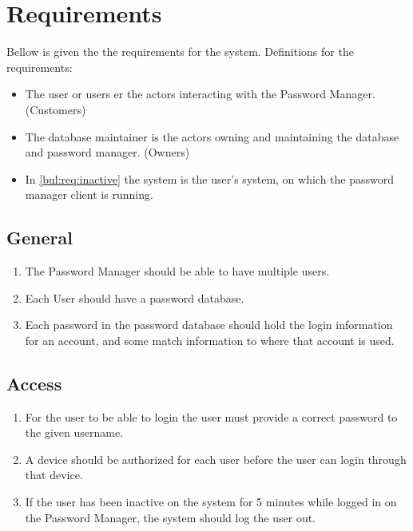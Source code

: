 \chapter{Requirements}
Bellow is given the the requirements for the system. Definitions for the requirements:
\begin{itemize}
    \item The user or users er the actors interacting with the Password Manager. (Customers)
    \item The database maintainer is the actors owning and maintaining the database and password manager. (Owners)
    \item In \ref{bul:req:inactive} the system is the user's system, on which the password manager client is running.
\end{itemize}

\section{General}
\begin{enumerate}[label={\textbf{Req. \arabic*}}, ref={req. \arabic*}]
    \item The Password Manager should be able to have multiple users.
    \item Each User should have a password database.
    \item Each password in the password database should hold the login information for an account, and some match information to where that account is used.

\end{enumerate}
\section{Access}
\begin{enumerate}[resume*]

    \item For the user to be able to login the user must provide a correct password to the given username.
    \item A device should be authorized for each user before the user can login through that device.
    \item If the user has been inactive on the system for 5 minutes while logged in on the Password Manager, the system should log the user out. \label{bul:req:inactive}

\end{enumerate}
